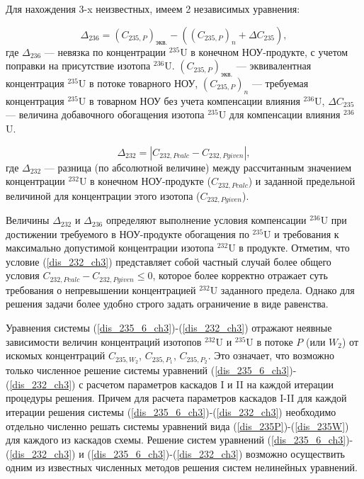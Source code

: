 Для нахождения 3-x неизвестных, имеем 2 независимых уравнения:  

\begin{equation}
    \label{dis_235_6_ch3}
    \Delta_{236}=(C_{235,P})_{\textit{экв.}}-((C_{235,P})_n+\Delta C_{235}),
\end{equation}
где $\Delta_{236}$ --- невязка по концентрации $^{235}$U в конечном НОУ-продукте, с учетом поправки на присутствие изотопа $^{236}$U. $(C_{235,P})_{\textit{экв.}}$ --- эквивалентная концентрация $^{235}$U в потоке товарного НОУ, $(C_{235,P})_n$ --- требуемая концентрация $^{235}$U в товарном НОУ без учета компенсации влияния $^{236}$U, $\Delta C_{235}$ --- величина добавочного обогащения изотопа $^{235}$U для компенсации влияния $^{236}$U. 

\begin{equation}
\label{dis_232_ch3}
\Delta_{232}=\left|C_{232,P\textit{calc}}-C_{232,P\textit{given}}\right|,
\end{equation}
где $\Delta_{232}$ --- разница (по абсолютной величине) между рассчитанным значением концентрации $^{232}$U в конечном НОУ-продукте ($C_{232,P\textit{calc}}$) и заданной предельной величиной для концентрации этого изотопа ($C_{232,P\textit{given}}$).

Величины $\Delta_{232}$ и $\Delta_{236}$ определяют выполнение условия компенсации $^{236}$U при достижении требуемого в НОУ-продукте обогащения по $^{235}$U и требования к максимально допустимой концентрации изотопа $^{232}$U в продукте. Отметим, что условие (\ref{dis_232_ch3}) представляет собой частный случай более общего условия $C_{232,P\textit{calc}}-C_{232,P\textit{given}}\leq 0$, которое более корректно отражает суть требования о непревышении концентрацией $^{232}$U заданного предела. Однако для решения задачи более удобно строго задать ограничение в виде равенства. 

Уравнения системы (\ref{dis_235_6_ch3})-(\ref{dis_232_ch3}) отражают неявные зависимости величин концентраций изотопов $^{232}$U и $^{235}$U в потоке $P$ (или $W_2$) от искомых концентраций $C_{235,{W_2}}$, $C_{235,{P_1}}$, $C_{235,{P_2}}$. Это означает, что возможно только численное решение системы уравнений (\ref{dis_235_6_ch3})-(\ref{dis_232_ch3}) с расчетом параметров каскадов I и II на каждой итерации процедуры решения. Причем для расчета параметров каскадов I-II для каждой итерации решения системы (\ref{dis_235_6_ch3})-(\ref{dis_232_ch3}) необходимо отдельно численно решать системы уравнений вида (\ref{dis_235P})-(\ref{dis_235W}) для каждого из каскадов схемы. Решение систем уравнений (\ref{dis_235_6_ch3})-(\ref{dis_232_ch3}) и (\ref{dis_235_6_ch3})-(\ref{dis_232_ch3}) возможно осуществить одним из известных численных методов решения систем нелинейных уравнений. 


